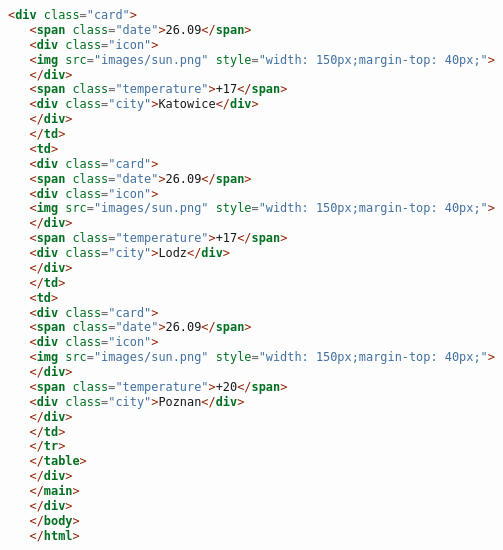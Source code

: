 \begin{lstlisting}[language=HTML,caption=Исходный код страницы Poland]
   <div class="card">
   <span class="date">26.09</span>
   <div class="icon">
   <img src="images/sun.png" style="width: 150px;margin-top: 40px;">
   </div>
   <span class="temperature">+17</span>
   <div class="city">Katowice</div>
   </div>
   </td>
   <td>
   <div class="card">
   <span class="date">26.09</span>
   <div class="icon">
   <img src="images/sun.png" style="width: 150px;margin-top: 40px;">
   </div>
   <span class="temperature">+17</span>
   <div class="city">Lodz</div>
   </div>
   </td>
   <td>
   <div class="card">
   <span class="date">26.09</span>
   <div class="icon">
   <img src="images/sun.png" style="width: 150px;margin-top: 40px;">
   </div>
   <span class="temperature">+20</span>
   <div class="city">Poznan</div>
   </div>
   </td>
   </tr>
   </table>
   </div>
   </main>
   </div>
   </body>
   </html>
\end{lstlisting}



